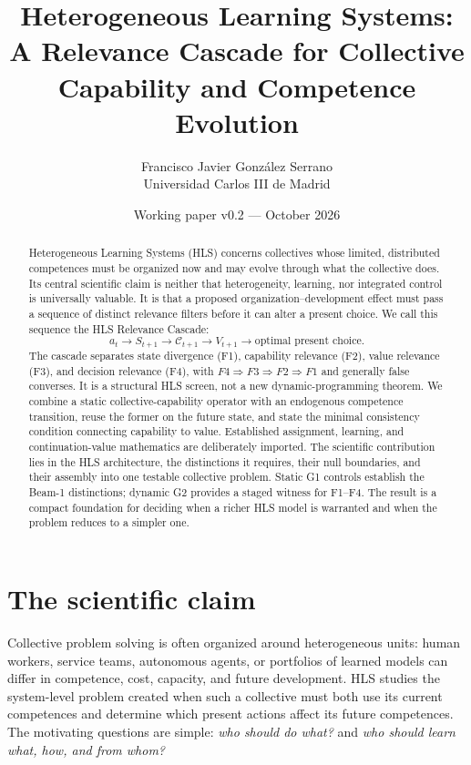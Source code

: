 \documentclass[10pt]{article}
\title{\textbf{Heterogeneous Learning Systems: A Relevance Cascade for Collective Capability and Competence Evolution}}
\author{Francisco Javier Gonz\'alez Serrano\\Universidad Carlos III de Madrid}
\date{Working paper v0.2 --- October 2026}
\newcommand{\Ccap}{\mathcal{C}}
\begin{document}
\maketitle

\begin{abstract}
Heterogeneous Learning Systems (HLS) concerns collectives whose limited,
distributed competences must be organized now and may evolve through what the
collective does. Its central scientific claim is neither that heterogeneity,
learning, nor integrated control is universally valuable. It is that a proposed
organization--development effect must pass a sequence of distinct relevance
filters before it can alter a present choice. We call this sequence the HLS
Relevance Cascade:
\[
a_t \longrightarrow S_{t+1} \longrightarrow \Ccap_{t+1}
\longrightarrow V_{t+1} \longrightarrow \text{optimal present choice}.
\]
The cascade separates state divergence (F1), capability relevance (F2), value
relevance (F3), and decision relevance (F4), with
$F4\Rightarrow F3\Rightarrow F2\Rightarrow F1$ and generally false
converses. It is a structural HLS screen, not a new dynamic-programming
theorem. We combine a static collective-capability operator with an endogenous
competence transition, reuse the former on the future state, and state the
minimal consistency condition connecting capability to value. Established
assignment, learning, and continuation-value mathematics are deliberately
imported. The scientific contribution lies in the HLS architecture, the
distinctions it requires, their null boundaries, and their assembly into one
testable collective problem. Static G1 controls establish the Beam-1
distinctions; dynamic G2 provides a staged witness for F1--F4. The result is a
compact foundation for deciding when a richer HLS model is warranted and when
the problem reduces to a simpler one.
\end{abstract}

\section{The scientific claim}

Collective problem solving is often organized around heterogeneous units: human
workers, service teams, autonomous agents, or portfolios of learned models can
differ in competence, cost, capacity, and future development. HLS studies the
system-level problem created when such a collective must both use its current
competences and determine which present actions affect its future competences.
The motivating questions are simple: \emph{who should do what?} and \emph{who
should learn what, how, and from whom?}
\end{document}
